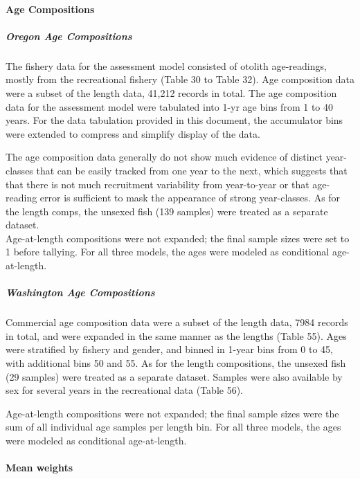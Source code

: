 \documentclass[11pt,
  english,
  letterpaper,
]{article}
\begin{document}
\hypertarget{age-compositions}{%
\paragraph{Age Compositions}\label{age-compositions}}

\hypertarget{oregon-age-compositions}{%
\subparagraph{Oregon Age Compositions}\label{oregon-age-compositions}}

The fishery data for the assessment model consisted of otolith age-readings, mostly from the recreational fishery (Table 30 to Table 32). Age composition data were a subset of the length data, 41,212 records in total. The age composition data for the assessment model were tabulated into 1-yr age bins from 1 to 40 years. For the data tabulation provided in this document, the accumulator bins were extended to compress and simplify display of the data.

The age composition data generally do not show much evidence of distinct year-classes that can be easily tracked from one year to the next, which suggests that that there is not much recruitment variability from year-to-year or that age-reading error is sufficient to mask the appearance of strong year-classes. As for the length comps, the unsexed fish (139 samples) were treated as a separate dataset.\\
Age-at-length compositions were not expanded; the final sample sizes were set to 1 before tallying. For all three models, the ages were modeled as conditional age-at-length.

\hypertarget{washington-age-compositions}{%
\subparagraph{Washington Age Compositions}\label{washington-age-compositions}}

Commercial age composition data were a subset of the length data, 7984 records in total, and were expanded in the same manner as the lengths (Table 55). Ages were stratified by fishery and gender, and binned in 1-year bins from 0 to 45, with additional bins 50 and 55. As for the length compositions, the unsexed fish (29 samples) were treated as a separate dataset. Samples were also available by sex for several years in the recreational data (Table 56).

Age-at-length compositions were not expanded; the final sample sizes were the sum of all individual age samples per length bin. For all three models, the ages were modeled as conditional age-at-length.

\hypertarget{mean-weights}{%
\paragraph{Mean weights}\label{mean-weights}}
\end{document}
